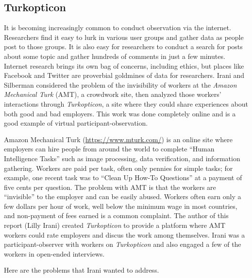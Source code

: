 \subsection{Turkopticon}

It is becoming increasingly common to conduct observation via the internet. Researchers find it easy to lurk in various user groups and gather data as people post to those groups. It is also easy for researchers to conduct a search for posts about some topic and gather hundreds of comments in just a few minutes. Internet research brings its own bag of concerns, including ethics, but places like Facebook and Twitter are proverbial goldmines of data for researchers. Irani and Silberman considered the problem of the invisibility of workers at the \textit{Amazon Mechanical Turk} (AMT), a crowdwork site, then analyzed those workers' interactions through \textit{Turkopticon}, a site where they could share experiences about both good and bad employers. This work was done completely online and is a good example of virtual participant-observation\cite{irani2013turkopticon}.

Amazon Mechanical Turk (\url{https://www.mturk.com/}) is an online site where employers can hire people from around the world to complete ``Human Intelligence Tasks'' such as image processing, data verification, and information gathering. Workers are paid per task, often only pennies for simple tasks; for example, one recent task was to ``Clean Up How-To Questions'' at a payment of five cents per question. The problem with AMT is that the workers are ``invisible'' to the employer and can be easily abused. Workers often earn only a few dollars per hour of work, well below the minimum wage in most countries, and non-payment of fees earned is a common complaint. The author of this report (Lilly Irani) created \textit{Turkopticon} to provide a platform where AMT workers could rate employers and discus the work among themselves. Irani was a participant-observer with workers on \textit{Turkopticon} and also engaged a few of the workers in open-ended interviews.

Here are the problems that Irani wanted to address.

